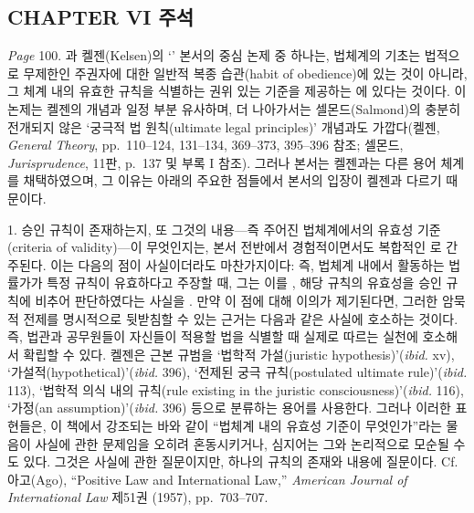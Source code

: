 {\footnotesize

\subsection{CHAPTER VI 주석}\label{uxc81c6uxc7a5-uxc8fcuxc11d-chapter-vi-notes}

\emph{Page} 100. 과 켈젠(Kelsen)의
`' 본서의 중심 논제 중 하나는, 법체계의
기초는 법적으로 무제한인 주권자에 대한 일반적 복종 습관(habit of
obedience)에 있는 것이 아니라, 그 체계 내의 유효한 규칙을 식별하는 권위
있는 기준을 제공하는 에 있다는 것이다. 이 논제는 켈젠의  개념과 일정 부분 유사하며, 더 나아가서는 셀몬드(Salmond)의 충분히
전개되지 않은 `궁극적 법 원칙(ultimate legal principles)' 개념과도
가깝다(켈젠, \emph{General Theory}, pp.~110--124, 131--134, 369--373,
395--396 참조; 셀몬드, \emph{Jurisprudence}, 11판, p.~137 및 부록 I
참조). 그러나 본서는 켈젠과는 다른 용어 체계를 채택하였으며, 그 이유는
아래의 주요한 점들에서 본서의 입장이 켈젠과 다르기 때문이다.

 1. 승인 규칙이 존재하는지, 또 그것의 내용---즉 주어진 법체계에서의 유효성
기준(criteria of validity)---이 무엇인지는, 본서 전반에서
경험적이면서도 복합적인 로 간주된다.
이는 다음의 점이 사실이더라도 마찬가지이다: 즉, 법체계 내에서 활동하는
법률가가 특정 규칙이 유효하다고 주장할 때, 그는 이를 , 해당 규칙의 유효성을 승인 규칙에
비추어 판단하였다는 사실을 . 만약 이 점에 대해 이의가 제기된다면, 그러한 암묵적
전제를 명시적으로 뒷받침할 수 있는 근거는 다음과 같은 사실에 호소하는
것이다. 즉, 법관과 공무원들이 자신들이 적용할 법을 식별할 때 실제로
따르는 실천에 호소해서 확립할 수 있다. 켈젠은 근본 규범을 `법학적
가설(juristic hypothesis)'(\emph{ibid.} xv),
`가설적(hypothetical)'(\emph{ibid.} 396), `전제된 궁극 규칙(postulated
ultimate rule)'(\emph{ibid.} 113), `법학적 의식 내의 규칙(rule
existing in the juristic consciousness)'(\emph{ibid.} 116), `가정(an
assumption)'(\emph{ibid.} 396) 등으로 분류하는 용어를 사용한다. 그러나
이러한 표현들은, 이 책에서 강조되는 바와 같이 ``법체계 내의 유효성
기준이 무엇인가''라는 물음이 사실에 관한 문제임을 오히려 혼동시키거나,
심지어는 그와 논리적으로 모순될 수도 있다. 그것은 사실에 관한
질문이지만, 하나의 규칙의 존재와 내용에  질문이다.
Cf. 아고(Ago), ``Positive Law and International Law,'' \emph{American
Journal of International Law} 제51권 (1957), pp.~703--707.

}
